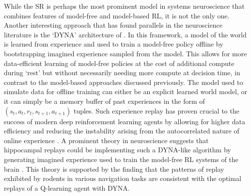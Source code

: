 While the SR is perhaps the most prominent model in systems neuroscience that combines features of model-free and model-based RL, it is not the only one.
Another interesting approach that has found parallels in the neuroscience literature is the `DYNA' architecture of \citet{sutton1991dyna}.
In this framework, a model of the world is learned from experience and used to train a model-free policy offline by bootstrapping imagined experience sampled from the model.
This allows for more data-efficient learning of model-free policies at the cost of additional compute during `rest' but without necessarily needing more compute at decision time, in contrast to the model-based approaches discussed previously.
The model used to simulate data for offline training can either be an explicit learned world model, or it can simply be a memory buffer of past experiences in the form of $(s_t, a_t, r_t, s_{t+1}, a_{t+1})$ tuples.
Such experience replay has proven crucial to the success of modern deep reinforcement learning agents by allowing for higher data efficiency and reducing the instability arising from the autocorrelated nature of online experience \citep{mnih2013playing,schaul2015prioritized}.
A prominent theory in neuroscience suggests that hippocampal replays could be implementing such a DYNA-like algorithm by generating imagined experience used to train the model-free RL systems of the brain \citep{mattar2018prioritized}.
This theory is supported by the finding that the patterns of replay exhibited by rodents in various navigation tasks are consistent with the optimal replays of a Q-learning agent with DYNA.
